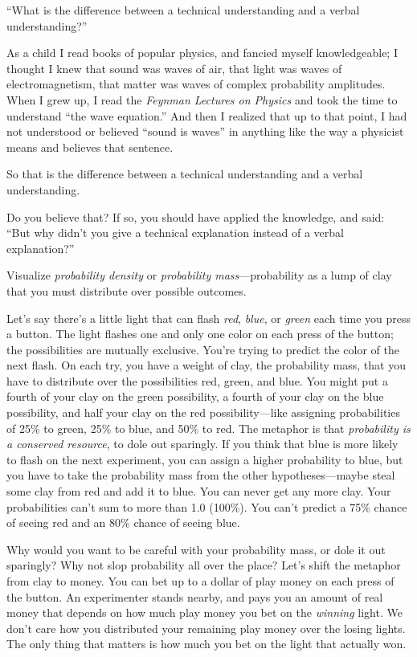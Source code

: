 {
 ``What is the difference between a technical
understanding and a verbal understanding?''}

{
 As a child I read books of popular physics, and fancied myself
knowledgeable; I thought I knew that sound was waves of air, that light
was waves of electromagnetism, that matter was waves of complex
probability amplitudes. When I grew up, I read the \textit{Feynman
Lectures on Physics} and took the time to understand
``the wave
equation.'' And then I realized
that up to that point, I had not understood or believed
``sound is waves'' in anything like
the way a physicist means and believes that sentence.}

{
 So that is the difference between a technical understanding and a
verbal understanding.}

{
 Do you believe that? If so, you should have applied the knowledge,
and said: ``But why didn't you give a
technical explanation instead of a verbal
explanation?''}

{
 Visualize \textit{probability density} or \textit{probability
mass}{}---probability as a lump of clay that you must distribute over
possible outcomes.}

{
 Let's say there's a little light
that can flash \textit{red}, \textit{blue}, or \textit{green} each time
you press a button. The light flashes one and only one color on each
press of the button; the possibilities are mutually exclusive.
You're trying to predict the color of the next flash.
On each try, you have a weight of clay, the probability mass, that you
have to distribute over the possibilities red, green, and blue. You
might put a fourth of your clay on the green possibility, a fourth of
your clay on the blue possibility, and half your clay on the red
possibility---like assigning probabilities of 25\% to green, 25\% to
blue, and 50\% to red. The metaphor is that \textit{probability is a
conserved resource}, to dole out sparingly. If you think that blue is
more likely to flash on the next experiment, you can assign a higher
probability to blue, but you have to take the probability mass from the
other hypotheses---maybe steal some clay from red and add it to blue.
You can never get any more clay. Your probabilities
can't sum to more than 1.0 (100\%). You
can't predict a 75\% chance of seeing red and an 80\%
chance of seeing blue.}

{
 Why would you want to be careful with your probability mass, or
dole it out sparingly? Why not slop probability all over the place?
Let's shift the metaphor from clay to money. You can
bet up to a dollar of play money on each press of the button. An
experimenter stands nearby, and pays you an amount of real money that
depends on how much play money you bet on the \textit{winning} light.
We don't care how you distributed your remaining play
money over the losing lights. The only thing that matters is how much
you bet on the light that actually won.}

